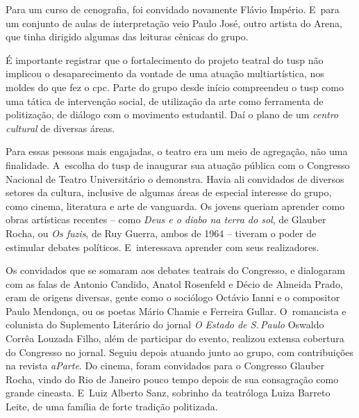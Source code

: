 Para um curso de cenografia, foi convidado novamente Flávio
Império. E~para um conjunto de aulas de interpretação veio Paulo
José, outro artista do Arena, que tinha dirigido algumas das leituras
cênicas do grupo.

\subject{Frentes de cinema, literatura, música e comunicação de massa}

É importante registrar que o fortalecimento do projeto teatral do {\sc tusp}
não implicou o desaparecimento da vontade de uma atuação
multiartística, nos moldes do que fez o {\sc cpc}. Parte do grupo desde
início compreendeu o {\sc tusp} como uma tática de intervenção social, de
utilização da arte como ferramenta de politização, de diálogo com o
movimento estudantil. Daí o plano de um {\it centro cultural} de
diversas áreas.

Para essas pessoas mais engajadas, o teatro era um meio de agregação,
não uma finalidade. A~escolha do {\sc tusp} de inaugurar sua atuação pública
com o Congresso Nacional de Teatro Universitário o demonstra.
Havia ali convidados de diversos setores da cultura, inclusive de
algumas áreas de especial interesse do grupo, como cinema, literatura e
arte de vanguarda. Os jovens queriam aprender como obras artísticas
recentes -- como {\it Deus e o diabo na terra do sol}, de Glauber Rocha,
ou {\it Os fuzis}, de Ruy Guerra, ambos de 1964 -- tiveram o poder de
estimular debates políticos. E~interessava aprender com seus
realizadores.

Os convidados que se somaram aos debates teatrais do Congresso, e
dialogaram com as falas de Antonio Candido, Anatol Rosenfeld e Décio de
Almeida Prado, eram de origens diversas, gente como o
sociólogo Octávio Ianni e o compositor Paulo Mendonça, ou os poetas
Mário Chamie e Ferreira Gullar. O~romancista e colunista do Suplemento
Literário do jornal {\it O Estado de S.\,Paulo} Oswaldo Corrêa Louzada
Filho, além de participar do evento, realizou extensa cobertura do
Congresso no jornal. Seguiu depois atuando junto ao grupo, com
contribuições na revista {\it aParte}. Do cinema, foram convidados para
o Congresso Glauber Rocha, vindo do Rio de Janeiro pouco tempo depois de
sua consagração como grande cineasta. E~Luiz Alberto Sanz, sobrinho da
teatróloga Luiza Barreto Leite, de uma família de forte tradição
politizada.


